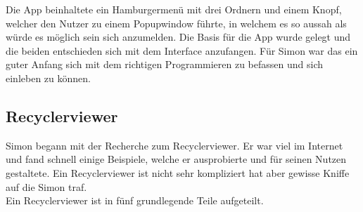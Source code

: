 \documentclass[a4paper,11pt]{article}
\begin{document}
Die App beinhaltete ein Hamburgermenü mit drei Ordnern und einem Knopf, welcher den Nutzer zu einem Popupwindow führte, in welchem es so aussah als würde es möglich sein sich anzumelden.  
Die Basis für die App wurde gelegt und die beiden entschieden sich mit dem Interface anzufangen. Für Simon war das ein guter Anfang sich mit dem 
richtigen Programmieren zu befassen und sich einleben zu können. 

\subsection{Recyclerviewer}

Simon begann mit der Recherche zum Recyclerviewer. Er war viel im Internet und fand schnell
einige Beispiele, welche er ausprobierte und für seinen Nutzen gestaltete. Ein Recyclerviewer ist nicht sehr kompliziert
hat aber gewisse Kniffe auf die Simon traf. \\

Ein Recyclerviewer ist in fünf grundlegende Teile aufgeteilt. 
\end{document}
